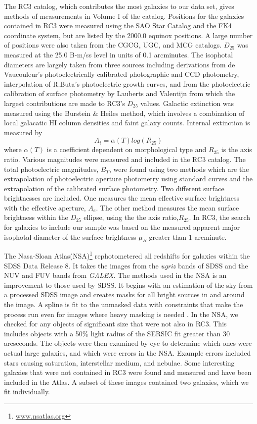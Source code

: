 \documentclass[12pt,preprint,pdftex]{aastex}
\begin{document}
The RC3 catalog, which contributes the most galaxies to our data set,
gives methods of measurements in Volume I of the catalog. Positions
for the galaxies contained in RC3 were measured using the SAO Star
Catalog and the FK4 coordinate system, but are listed by the 2000.0
equinox positions. A large number of positions were also taken from
the CGCG, UGC, and MCG catalogs. $D_{25}$ was measured at the 25.0
B-m/ss level in units of 0.1 arcminutes. The isophotal diameters are
largely taken from three sources including derivations from de
Vaucouleur's photoelectrically calibrated photographic and CCD
photometry, interpolation of R.Buta's photoelectric growth curves, and
from the photoelectric calibration of surface photometry by Lauberts
and Valentijn from which the largest contributions are made to RC3's
$D_{25}$ values. Galactic extinction was measured using the Burstein
\& Heiles method, which involves a combination of local galacatic HI
column densities and faint galaxy counts. Internal extinction is
measured by \begin{equation} A_i= \alpha(T)log(R_{25}) \end{equation}
where $\alpha(T)$ is a coefficient dependent on morphological type and
$R_{25}$ is the axis ratio. Various magnitudes were measured and
included in the RC3 catalog. The total photoelectric magnitudes,
$B_T$, were found using two methods which are the extrapolation of
photoelectric aperture photometry using standard curves and the
extrapolation of the calibrated surface photometry. Two different
surface brightnesses are included. One measures the mean effective
surface brightness with the effective aperture, $A_e$. The other
method measures the mean surface brightness within the $D_{25}$
ellipse, using the the axis ratio,$R_{25}$\citep{rc3}.
In RC3, the search for galaxies to include our sample was based on the measured
apparent major isophotal diameter of the surface brightness $\mu_{B}$
greater than 1 arcminute. 

The Nasa-Sloan Atlas(NSA)\footnote{\url{www.nsatlas.org}}
rephotometered all redshifts for galaxies within the SDSS Data Release
8. It takes the images from the \textit{ugriz} bands of SDSS and the
NUV and FUV bands from \textit{GALEX}. The methods used in the NSA is
an improvement to those used by SDSS. It begins with an estimation of
the sky from a processed SDSS image and creates masks for all bright
sources in and around the image. A spline is fit to the unmasked data
with constraints that make the process run even for images where heavy
masking is needed \citep{blanton11}. In the NSA, we checked for any
objects of significant size that were not also in RC3. This includes
objects with a 50\% light radius of the SERSIC fit greater than 30
arcseconds. The objects were then examined by eye to determine which
ones were actual large galaxies, and which were errors in the
NSA. Example errors included stars causing saturation, interstellar
medium, and nebulae. Some interesting galaxies that were not contained
in RC3 were found and measured and have been included in the Atlas. A
subset of these images contained two galaxies, which we fit
individually.
 
\end{document}
